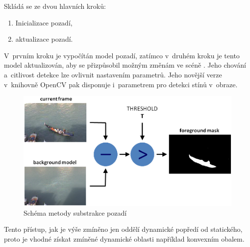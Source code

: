 Skládá se ze dvou hlavních kroků:
 \begin{enumerate}
    \item{Inicializace pozadí,}
    \item{aktualizace pozadí.}
 \end{enumerate}
 V~prvním kroku je vypočítán model pozadí, zatímco v~druhém kroku je tento model aktualizován, aby se přizpůsobil možným změnám ve scéně \cite{openCV:MOG}.
Jeho chování a~citlivost detekce lze ovlivnit nastavením parametrů. Jeho novější verze v~knihovně OpenCV pak disponuje i~parametrem pro detekci stínů v~obraze.
\begin{figure}[H]
  \centering
  \includegraphics[width=14cm]{figures/mog_scheme}
  \caption{Schéma metody substrakce pozadí \cite{openCV:MOG}}
  \label{mog_scheme}
\end{figure}

Tento přístup, jak je výše zmíněno jen oddělí dynamické popředí od statického, proto je vhodné získat zmíněné dynamické oblasti například konvexním obalem.

